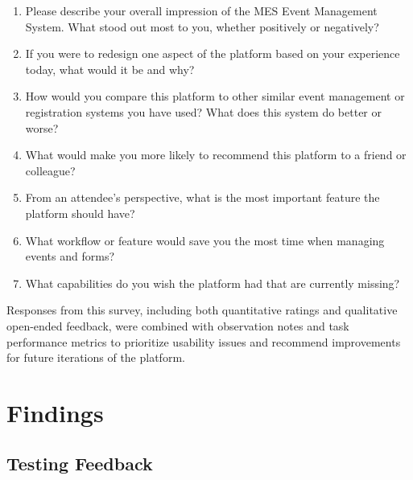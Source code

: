 \documentclass[12pt]{article}
\begin{document}
\begin{enumerate}
    \item Please describe your overall impression of the MES Event Management System. What stood out most to you, whether positively or negatively? \\
    \underline{\hspace{15cm}}
    \item If you were to redesign one aspect of the platform based on your experience today, what would it be and why? \\
    \underline{\hspace{15cm}}
    \item How would you compare this platform to other similar event management or registration systems you have used? What does this system do better or worse? \\
    \underline{\hspace{15cm}}
    \item What would make you more likely to recommend this platform to a friend or colleague? \\
    \underline{\hspace{15cm}}
    \item From an attendee's perspective, what is the most important feature the platform should have? \\
    \underline{\hspace{15cm}}
    \item What workflow or feature would save you the most time when managing events and forms? \\
    \underline{\hspace{15cm}}
    \item What capabilities do you wish the platform had that are currently missing? \\
    \underline{\hspace{15cm}}
\end{enumerate}

Responses from this survey, including both quantitative ratings and qualitative open-ended feedback, were combined with observation notes and task performance metrics to prioritize usability issues and recommend improvements for future iterations of the platform.


\section{Findings}
\subsection{Testing Feedback}
\end{document}
